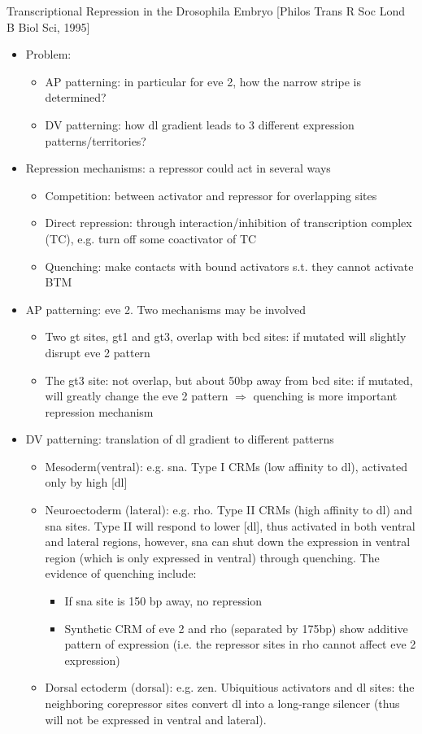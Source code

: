 \documentclass{report}
\begin{document}
Transcriptional Repression in the Drosophila Embryo [Philos Trans R Soc Lond B Biol Sci, 1995]
\begin{itemize}
	\item Problem: 
	\begin{itemize}
		\item AP patterning: in particular for eve 2, how the narrow stripe is determined? 
		\item DV patterning: how dl gradient leads to 3 different expression patterns/territories? 
	\end{itemize}
	
	\item Repression mechanisms: a repressor could act in several ways
	\begin{itemize}
		\item Competition: between activator and repressor for overlapping sites 
		\item Direct repression: through interaction/inhibition of transcription complex (TC), e.g. turn off some coactivator of TC
		\item Quenching: make contacts with bound activators s.t. they cannot activate BTM
	\end{itemize}
	
	\item AP patterning: eve 2. Two mechanisms may be involved
	\begin{itemize}
		\item Two gt sites, gt1 and gt3, overlap with bcd sites: if mutated will slightly disrupt eve 2 pattern
		\item The gt3 site: not overlap, but about 50bp away from bcd site: if mutated, will greatly change the eve 2 pattern $\Rightarrow$ quenching is more important repression mechanism
	\end{itemize}
	
	\item DV patterning: translation of dl gradient to different patterns
	\begin{itemize}
		\item Mesoderm(ventral): e.g. sna. Type I CRMs (low affinity to dl), activated only by high [dl]
		\item Neuroectoderm (lateral): e.g. rho. Type II CRMs (high affinity to dl) and sna sites. Type II will respond to lower [dl], thus activated in both ventral and lateral regions, however, sna can shut down the expression in ventral region (which is only expressed in ventral) through quenching. The evidence of quenching include: 
		\begin{itemize}
			\item If sna site is 150 bp away, no repression
			\item Synthetic CRM of eve 2 and rho (separated by 175bp) show additive pattern of expression (i.e. the repressor sites in rho cannot affect eve 2 expression)
		\end{itemize}
		\item Dorsal ectoderm (dorsal): e.g. zen. Ubiquitious activators and dl sites: the neighboring corepressor sites convert dl into a long-range silencer (thus will not be expressed in ventral and lateral). 
	\end{itemize}
\end{itemize}
\end{document}
